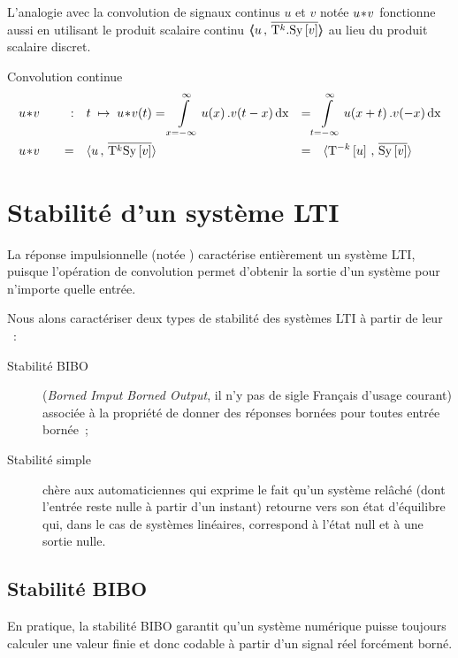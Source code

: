 L'analogie avec la convolution de signaux continus $u$ et $v$ notée
$u\!\ast\! v$ fonctionne aussi en utilisant le produit scalaire continu
$\langle\!\!\langle u\,,\,\overline{\mathrm{T}^k.\mathrm{Sy}\left[v\right]}\rangle\!\!\rangle$ au lieu du produit scalaire
discret.

\begin{definition}{Convolution continue}
  \begin{align}
    \label{eq:convolution_continue}
    &u\conv v \quad &:& \quad  t \;\mapsto\; u\conv v\de{t} =\integ{x=-\infty}{\infty}{u\de{x}.v\de{t-x}\dx} &=& \integ{t=-\infty}{\infty}{u\de{x+t}.v\de{-x}\dx} \nonumber\\
    &u\conv v & = & \quad \scal{u}{\conj{\oret^k\Sy\b{v}}} &=& \quad\scal{\oret^{-k}\b{u}}{\conj{\Sy\b{v}}} 
  \end{align}
\end{definition}


\section{Stabilité d'un système LTI}
\label{sec:stabilite}
La réponse impulsionnelle (notée \RIP) caractérise entièrement un
système LTI, puisque l'opération de convolution permet d'obtenir la
sortie d'un système pour n'importe quelle entrée.

Nous alons caractériser deux types de stabilité des systèmes LTI à
partir de leur \RIP{}~:
\begin{description}
\item[Stabilité BIBO] (\emph{Borned Imput Borned Output}, il n'y pas
  de sigle Français d'usage courant) associée à la propriété de donner
  des réponses bornées pour toutes entrée bornée~;
\item[Stabilité simple] chère aux automaticiennes qui exprime le fait
  qu'un système relâché (dont l'entrée reste nulle à partir d'un
  instant) retourne vers son état d'équilibre qui, dans le cas de
  systèmes linéaires, correspond à l'état null et à une sortie nulle.
\end{description}

\subsection{Stabilité BIBO}

En pratique, la stabilité BIBO garantit qu'un système numérique puisse
toujours calculer une valeur finie et donc codable à partir d'un
signal réel forcément borné.

